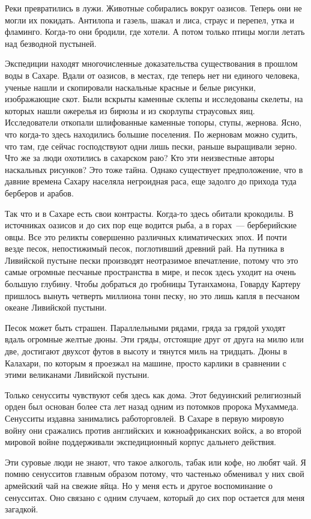\documentclass[12pt,a4paper,twoside,openany,svgnames]{memoir}
\begin{document}
Реки превратились в лужи. Животные собирались вокруг оазисов. Теперь они не могли их покидать. Антилопа и газель, шакал и лиса, страус и перепел, утка и фламинго. Когда-то они бродили, где хотели. А потом только птицы могли летать над безводной пустыней.

Экспедиции находят многочисленные доказательства существования в прошлом воды в Сахаре. Вдали от оазисов, в местах, где теперь нет ни единого человека, ученые нашли и скопировали наскальные красные и белые рисунки, изображающие скот. Были вскрыты каменные склепы и исследованы скелеты, на которых нашли ожерелья из бирюзы и из скорлупы страусовых яиц. Исследователи откопали шлифованные каменные топоры, ступы, жернова. Ясно, что когда-то здесь находились большие поселения. По жерновам можно судить, что там, где сейчас господствуют одни лишь пески, раньше выращивали зерно. Что же за люди охотились в сахарском раю? Кто эти неизвестные авторы наскальных рисунков? Это тоже тайна. Однако существует предположение, что в давние времена Сахару населяла негроидная раса, еще задолго до прихода туда берберов и арабов.

Так что и в Сахаре есть свои контрасты. Когда-то здесь обитали крокодилы. В источниках оазисов и до сих пор еще водится рыба, а в горах~--- берберийские овцы. Все это реликты совершенно различных климатических эпох. И почти везде песок, непостижимый песок, поглотивший древний рай. На путника в Ливийской пустыне пески производят неотразимое впечатление, потому что это самые огромные песчаные пространства в мире, и песок здесь уходит на очень большую глубину. Чтобы добраться до гробницы Тутанхамона, Говарду Картеру пришлось вынуть четверть миллиона тонн песку, но это лишь капля в песчаном океане Ливийской пустыни.

Песок может быть страшен. Параллельными рядами, гряда за грядой уходят вдаль огромные желтые дюны. Эти гряды, отстоящие друг от друга на милю или две, достигают двухсот футов в высоту и тянутся миль на тридцать. Дюны в Калахари, по которым я проезжал на машине, просто карлики в сравнении с этими великанами Ливийской пустыни.

Только сенусситы чувствуют себя здесь как дома. Этот бедуинский религиозный орден был основан более ста лет назад одним из потомков пророка Мухаммеда. Сенусситы издавна занимались работорговлей. В Сахаре в первую мировую войну они сражались против английских и южноафриканских войск, а во второй мировой войне поддерживали экспедиционный корпус дальнего действия.

Эти суровые люди не знают, что такое алкоголь, табак или кофе, но любят чай. Я помню сенусситов главным образом потому, что частенько обменивал у них свой армейский чай на свежие яйца. Но у меня есть и другое воспоминание о сенусситах. Оно связано с одним случаем, который до сих пор остается для меня загадкой.
\end{document}
